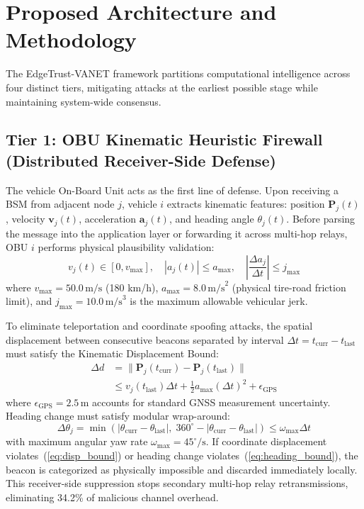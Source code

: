 \documentclass[conference]{IEEEtran}
\begin{document}
\section{Proposed Architecture and Methodology}

The EdgeTrust-VANET framework partitions computational intelligence across four distinct tiers, mitigating attacks at the earliest possible stage while maintaining system-wide consensus.

\subsection{Tier 1: OBU Kinematic Heuristic Firewall (Distributed Receiver-Side Defense)}

The vehicle On-Board Unit acts as the first line of defense. Upon receiving a BSM from adjacent node $j$, vehicle $i$ extracts kinematic features: position $\mathbf{P}_j(t)$, velocity $\mathbf{v}_j(t)$, acceleration $\mathbf{a}_j(t)$, and heading angle $\theta_j(t)$. Before parsing the message into the application layer or forwarding it across multi-hop relays, OBU $i$ performs physical plausibility validation:
\begin{equation}
v_j(t) \in [0, v_{\text{max}}], \quad |a_j(t)| \le a_{\text{max}}, \quad \left|\frac{\Delta a_j}{\Delta t}\right| \le j_{\text{max}}
\label{eq:kin_bounds}
\end{equation}
where $v_{\text{max}} = 50.0\,\text{m/s}$ (180 km/h), $a_{\text{max}} = 8.0\,\text{m/s}^2$ (physical tire-road friction limit), and $j_{\text{max}} = 10.0\,\text{m/s}^3$ is the maximum allowable vehicular jerk.

To eliminate teleportation and coordinate spoofing attacks, the spatial displacement between consecutive beacons separated by interval $\Delta t = t_{\text{curr}} - t_{\text{last}}$ must satisfy the Kinematic Displacement Bound:
\begin{equation}
\begin{split}
\Delta d &= \|\mathbf{P}_j(t_{\text{curr}}) - \mathbf{P}_j(t_{\text{last}})\| \\
&\le v_j(t_{\text{last}})\Delta t + \frac{1}{2}a_{\text{max}}(\Delta t)^2 + \epsilon_{\text{GPS}}
\end{split}
\label{eq:disp_bound}
\end{equation}
where $\epsilon_{\text{GPS}} = 2.5\,\text{m}$ accounts for standard GNSS measurement uncertainty. Heading change must satisfy modular wrap-around:
\begin{equation}
\Delta \theta_j = \min\left(|\theta_{\text{curr}} - \theta_{\text{last}}|, \; 360^\circ - |\theta_{\text{curr}} - \theta_{\text{last}}|\right) \le \omega_{\text{max}} \Delta t
\label{eq:heading_bound}
\end{equation}
with maximum angular yaw rate $\omega_{\text{max}} = 45^\circ/\text{s}$. If coordinate displacement violates~(\ref{eq:disp_bound}) or heading change violates~(\ref{eq:heading_bound}), the beacon is categorized as physically impossible and discarded immediately locally. This receiver-side suppression stops secondary multi-hop relay retransmissions, eliminating 34.2\% of malicious channel overhead.
\end{document}
